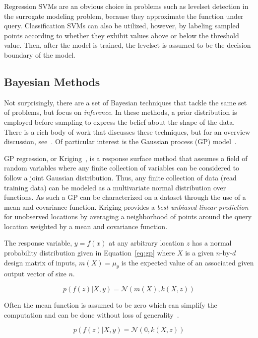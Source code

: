 Regression SVMs are an obvious choice in problems such as levelset detection in the surrogate modeling problem, because they approximate the function under query.
%
Classification SVMs can also be utilized, however, by labeling sampled points according to whether they exhibit values above or below the threshold value.
%
Then, after the model is trained, the levelset is assumed to be the decision boundary of the model.

\subsection{Bayesian Methods}

Not surprisingly, there are a set of Bayesian techniques that tackle the same set of problems, but focus on \emph{inference}.
%
In these methods, a prior distribution is employed before sampling to express the belief about the shape of the data.
%
There is a rich body of work that discusses these techniques, but for an overview discussion, see~\cite{MacKay1992b}.
%
Of particular interest is the Gaussian process (GP) model~\cite{RasmussenWilliams2006}.

GP regression, or Kriging~\cite{Stein1999}, is a response surface method that assumes a field of random variables where any finite collection of variables can be considered to follow a joint Gaussian distribution.
%
Thus, any finite collection of data (read training data) can be modeled as a multivariate normal distribution over functions.
%
As such a GP can be characterized on a dataset through the use of a mean and covariance function.
%
Kriging provides a \emph{best unbiased linear prediction} for unobserved locations by averaging a neighborhood of points around the query location weighted by a mean and covariance function.

The response variable, $y=f(x)$ at any arbitrary location $z$ has a normal probability distribution given in Equation~\ref{eq:gp} where $X$ is a given $n$-by-$d$ design matrix of inputs, $m(X) = \mu_y$ is the expected value of an associated given output vector of size $n$.

\begin{equation}
p(f(z)|X,y) = \mathcal{N}(m(X),k(X,z))
\label{eq:gp}
\end{equation}

Often the mean function is assumed to be zero which can simplify the computation and can be done without loss of generality~\cite{Seeger2004}.

\begin{equation}
p(f(z)|X,y) = \mathcal{N}(0,k(X,z))
\label{eq:gpSimple}
\end{equation}

